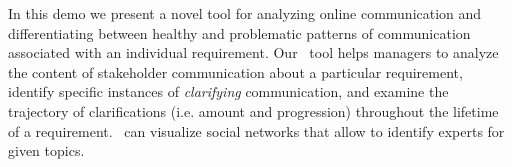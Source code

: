 
In this demo we present a novel tool for analyzing online communication and differentiating between healthy and problematic patterns of communication associated with an individual requirement. 
Our \viss\ tool helps managers to analyze the content of stakeholder communication about  a particular requirement, identify specific instances of \emph{clarifying} communication, and examine the trajectory of clarifications (i.e. amount and progression) throughout the lifetime of a requirement. 
\viss\ can visualize social networks that allow to identify experts for given topics.





